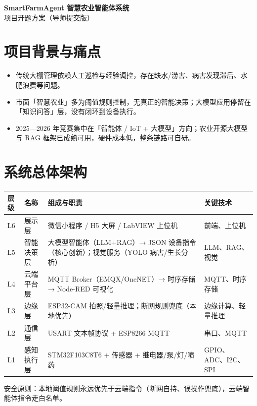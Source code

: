 \documentclass[11pt]{ctexart}
\begin{document}
\begin{center}
  {\LARGE\bfseries SmartFarmAgent 智慧农业智能体系统}\\[4pt]
  {\large 项目开题方案（导师提交版）}
\end{center}

\vspace{0.5em}

\section{项目背景与痛点}
\begin{itemize}
  \item 传统大棚管理依赖人工巡检与经验调控，存在缺水/涝害、病害发现滞后、水肥浪费等问题。
  \item 市面「智慧农业」多为阈值规则控制，无真正的智能决策；大模型应用停留在「知识问答」层，没有闭环到设备执行。
  \item 2025—2026 年竞赛集中在「智能体 / IoT + 大模型」方向；农业开源大模型与 RAG 框架已成熟可用，硬件成本低，整条链路可自研。
\end{itemize}

\section{系统总体架构}
\begin{longtable}{p{1.2cm}p{2.2cm}p{8.8cm}p{3.0cm}}
  \toprule
  层级 & 名称 & 组成与职责 & 关键技术 \\
  \midrule
  L6 & 展示层 & 微信小程序 / H5 大屏 / LabVIEW 上位机 & 前端、上位机 \\
  L5 & 智能决策层 & 大模型智能体（LLM+RAG）→ JSON 设备指令（核心创新）；视觉服务（YOLO 病害/生长分析） & LLM、RAG、视觉 \\
  L4 & 云端平台层 & MQTT Broker（EMQX/OneNET）→ 时序存储 → Node-RED 可视化 & MQTT、时序存储 \\
  L3 & 边缘层 & ESP32-CAM 拍照/轻量推理；断网规则兜底（本地优先） & 边缘计算、轻量推理 \\
  L2 & 通信层 & USART 文本帧协议 + ESP8266 MQTT & 串口、MQTT \\
  L1 & 感知执行层 & STM32F103C8T6 + 传感器 + 继电器/泵/灯/喷药 & GPIO、ADC、I2C、SPI \\
  \bottomrule
\end{longtable}
安全原则：本地阈值规则永远优先于云端指令（断网自持、误操作兜底），云端智能体指令走白名单。
\end{document}
